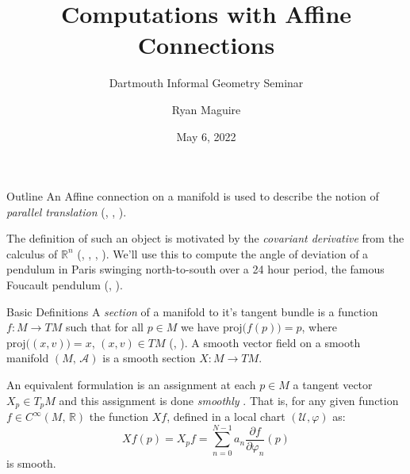 \documentclass{beamer}
\title{Computations with Affine Connections}
\subtitle{Dartmouth Informal Geometry Seminar}
\author{Ryan Maguire}
\institute{Dartmouth College}
\date{May 6, 2022}
\begin{document}
    \maketitle
    \begin{frame}{Outline}
        An Affine connection on a manifold is used to describe the notion of
        \textit{parallel translation}
        (\cite[p.~52]{DoCarmoRiemmanianGemoetry},
        \cite[p.~135]{JostRiemannianGeometryAndGeometricAnalysis},
        \cite[p.~105]{LeeRiemannianManifolds}).
        \par\hfill\par
        The definition of such an object is
        motivated by the \textit{covariant derivative} from the calculus of
        $\mathbb{R}^{n}$
        (\cite[p.~50]{DoCarmoRiemmanianGemoetry},
        \cite[p.~134]{JostRiemannianGeometryAndGeometricAnalysis},
        \cite[p.~89]{LeeRiemannianManifolds},
        \cite[p.~59]{OneillSemiRiemannianGeometry}).
        We'll use this to compute the angle of deviation of
        a pendulum in Paris swinging north-to-south over a 24 hour period,
        the famous Foucault pendulum
        (\cite[p.~821]{KrivoruchenkoFoucaultThomasPrecession},
        \cite[p.~515]{OpreaGeometryFoucault}).
    \end{frame}
    \begin{frame}{Basic Definitions}
        A \textit{section} of a manifold to it's tangent bundle is a function
        $f:M\rightarrow{TM}$ such that for all $p\in{M}$ we have
        $\textrm{proj}\big(f(p)\big)=p$, where
        $\textrm{proj}\big((x,v)\big)=x$, $(x,v)\in{TM}$
        (\cite[p.~384]{LeeRiemannianManifolds},
        \cite[p.~88,\,174]{LeeSmoothManifolds}).
        A smooth vector field on a smooth manifold $(M,\,\mathcal{A})$ is a
        smooth section $X:M\rightarrow{TM}$.
        \par\hfill\par
        An equivalent formulation is an assignment at each $p\in{M}$ a
        tangent vector $X_{p}\in{T}_{p}M$ and this assignment is done
        \textit{smoothly}
        \cite[p.~12]{OneillSemiRiemannianGeometry}.
        That is, for any given function
        $f\in{C}^{\infty}(M,\,\mathbb{R})$ the function $Xf$, defined in a
        local chart $(\mathcal{U},\varphi)$ as:
        \begin{equation}
            Xf(p)=X_{p}f
                =\sum_{n=0}^{N-1}a_{n}\frac{\partial{f}}{\partial\varphi_{n}}(p)
        \end{equation}
        is smooth.
    \end{frame}
\end{document}
